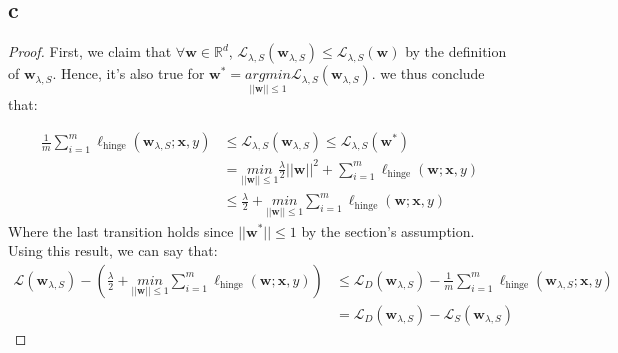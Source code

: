 \subsection*{c}
\begin{proof}
    First, we claim that $\forall \boldsymbol{w} \in \mathbb{R}^d$, $\mathcal{L}_{\lambda, S}(\boldsymbol{w}_{\lambda, S}) \leq \mathcal{L}_{\lambda, S}(\boldsymbol{w})$ by the definition of $\boldsymbol{w}_{\lambda, S}$. Hence, it's also true for $\boldsymbol{w}^* = \underset{||\boldsymbol{w}||\leq 1}{argmin} \mathcal{L}_{\lambda, S}(\boldsymbol{w}_{\lambda, S})$. we thus conclude that:

    \begin{equation*}
        \begin{split}            
            \frac{1}{m} \sum_{i=1}^m \ell_{\text{hinge}}(\boldsymbol{w}_{\lambda, S}; \boldsymbol{x}, y) 
            &\leq \mathcal{L}_{\lambda, S}(\boldsymbol{w}_{\lambda, S}) 
            \leq \mathcal{L}_{\lambda, S}(\boldsymbol{w}^*) \\
            &= \underset{||\boldsymbol{w}||\leq 1}{min} \frac{\lambda}{2} ||\boldsymbol{w}||^2 + \sum_{i=1}^m \ell_{\text{hinge}}(\boldsymbol{w}; \boldsymbol{x}, y) \\
            &\leq \frac{\lambda}{2} + \underset{||\boldsymbol{w}||\leq 1}{min} \sum_{i=1}^m \ell_{\text{hinge}}(\boldsymbol{w}; \boldsymbol{x}, y)
        \end{split}
    \end{equation*}
    Where the last transition holds since $||\boldsymbol{w}^*|| \leq 1$ by the section's assumption. Using this result, we can say that:
    \begin{equation*}
        \begin{split}            
            \mathcal{L}(\boldsymbol{w}_{\lambda, S}) - \left(\frac{\lambda}{2} + \underset{||\boldsymbol{w}||\leq 1}{min} \sum_{i=1}^m \ell_{\text{hinge}}(\boldsymbol{w}; \boldsymbol{x}, y)\right) 
            &\leq \mathcal{L}_D(\boldsymbol{w}_{\lambda, S}) - \frac{1}{m} \sum_{i=1}^m \ell_{\text{hinge}}(\boldsymbol{w}_{\lambda, S}; \boldsymbol{x}, y) \\
            &= \mathcal{L}_D(\boldsymbol{w}_{\lambda, S}) - \mathcal{L}_S(\boldsymbol{w}_{\lambda, S})
        \end{split}
    \end{equation*}


\end{proof}
